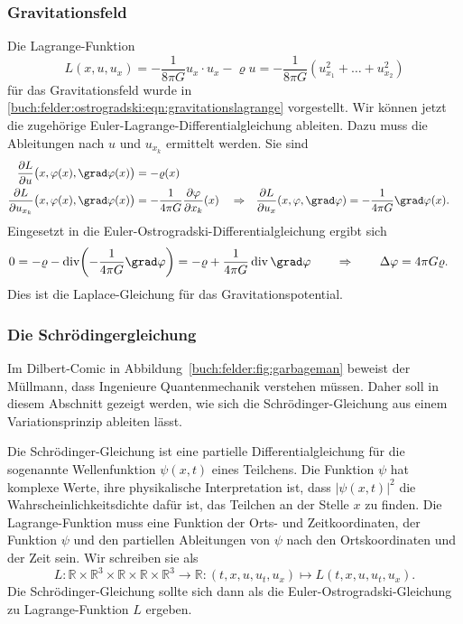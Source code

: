 %
%
\subsubsection{Gravitationsfeld}
Die Lagrange-Funktion
\[
L(x,u,u_x)
=
-\frac{1}{8\pi G}
u_x\cdot u_x 
-\varrho u
=
-\frac{1}{8\pi G}
(u_{x_1}^2 + \dots + u_{x_2}^2)
\]
für das Gravitationsfeld wurde in
\eqref{buch:felder:ostrogradski:eqn:gravitationslagrange}
vorgestellt.
Wir können jetzt die zugehörige Euler-Lagrange-Differentialgleichung
ableiten.
Dazu muss die Ableitungen nach $u$ und $u_{x_k}$ ermittelt werden.
Sie sind
\begin{align*}
\frac{\partial L}{\partial u}\bigl(x,\varphi(x),\grad\varphi(x)\bigr)
&=
-\varrho(x)
\\
\frac{\partial L}{\partial u_{x_k}}\bigl(x,\varphi(x),\grad \varphi(x)\bigr)
&=
-\frac{1}{4\pi G}\frac{\partial \varphi}{\partial x_k}(x)
&&\Rightarrow&
\frac{\partial L}{\partial u_x}(x,\varphi,\grad\varphi)
&=
-\frac{1}{4\pi G}\grad \varphi(x).
\end{align*}
Eingesetzt in die Euler-Ostrogradski-Differentialgleichung ergibt sich
\begin{align*}
0
&=
-\varrho
-
\operatorname{div} \biggl(-\frac{1}{4\pi G}\grad \varphi\biggr)
=
-\varrho + \frac{1}{4\pi G} \operatorname{div}\grad \varphi
\qquad\Rightarrow\qquad
\Delta \varphi = 4\pi G\varrho.
\end{align*}
Dies ist die Laplace-Gleichung für das Gravitationspotential.

%
%
\subsubsection{Die Schrödingergleichung}

Im Dilbert-Comic in Abbildung~\ref{buch:felder:fig:garbageman} beweist
der Müllmann, dass Ingenieure Quantenmechanik verstehen müssen.
Daher soll in diesem Abschnitt gezeigt werden, wie sich die
Schrödinger-Gleichung aus einem Variationsprinzip ableiten lässt.

Die Schrödinger-Gleichung ist eine partielle Differentialgleichung
für die sogenannte Wellenfunktion $\psi(x,t)$ eines Teilchens.
Die Funktion $\psi$ hat komplexe Werte, ihre physikalische
Interpretation ist, dass $|\psi(x,t)|^2$ die Wahrscheinlichkeitsdichte
dafür ist, das Teilchen an der Stelle $x$ zu finden.
Die Lagrange-Funktion muss eine Funktion der Orts- und Zeitkoordinaten,
der Funktion $\psi$ und den partiellen Ableitungen von $\psi$ nach
den Ortskoordinaten und der Zeit sein.
Wir schreiben sie als
\[
L
\colon
\mathbb{R}\times \mathbb{R}^3\times
\mathbb{R}\times
\mathbb{R}\times\mathbb{R}^3
\to\mathbb{R}
:
(t,x,u, u_t, u_x)
\mapsto
L(t,x,u, u_t, u_x).
\]
Die Schrödinger-Gleichung sollte sich dann als die Euler-Ostrogradski-Gleichung
zu La\-grange-Funktion $L$ ergeben.

